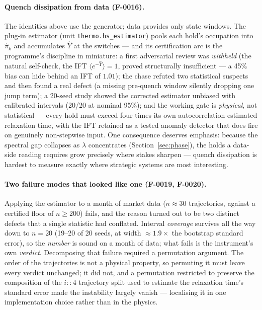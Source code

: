 \paragraph{Quench dissipation from data (F-0016).} The identities above
use the generator; data provides only state windows. The plug-in estimator
(unit \texttt{thermo.hs\_estimator}) pools each hold's occupation into
$\hat\pi_k$ and accumulates $\hat Y$ at the switches --- and its
certification arc is the programme's discipline in miniature: a first
adversarial review was \emph{withheld} (the natural self-check, the IFT
$\langle e^{-\hat Y}\rangle = 1$, proved structurally insufficient --- a
45\% bias can hide behind an IFT of $1.01$); the chase refuted two
statistical suspects and then found a real defect (a missing pre-quench
window silently dropping one jump term); a 20-seed study showed the
corrected estimator unbiased with calibrated intervals (20/20 at nominal
95\%); and the working gate is \emph{physical}, not statistical --- every
hold must exceed four times its own autocorrelation-estimated relaxation
time, with the IFT retained as a tested anomaly detector that does fire on
genuinely non-stepwise input. One consequence deserves emphasis: because
the spectral gap collapses as $\lambda$ concentrates
(Section~\ref{sec:phase}), the holds a data-side reading requires grow
precisely where stakes sharpen --- quench dissipation is hardest to
measure exactly where strategic systems are most interesting.

\paragraph{Two failure modes that looked like one (F-0019, F-0020).}
Applying the estimator to a month of market data ($n \approx 30$
trajectories, against a certified floor of $n \ge 200$) fails, and the
reason turned out to be two distinct defects that a single statistic had
conflated. Interval \emph{coverage} survives all the way down to $n = 20$
(19--20 of 20 seeds, at width $\approx 1.9\times$ the bootstrap standard
error), so the \emph{number} is sound on a month of data; what fails is the
instrument's own \emph{verdict}. Decomposing that failure required a
permutation argument. The order of the trajectories is not a physical
property, so permuting it must leave every verdict unchanged; it did not,
and a permutation restricted to preserve the composition of the $i{:}{:}4$
trajectory split used to estimate the relaxation time's standard error made
the instability largely vanish --- localising it in one implementation
choice rather than in the physics.

